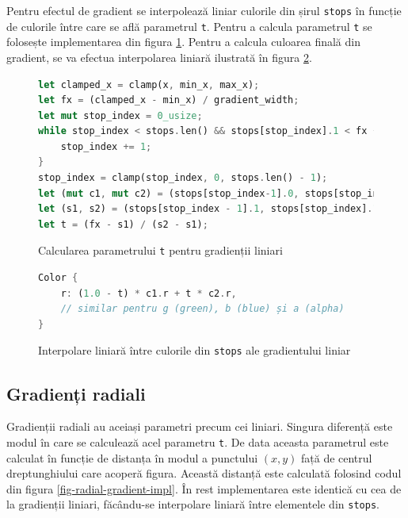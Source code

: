 \documentclass[a4paper, 12pt]{report}
\begin{document}
Pentru efectul de gradient se interpolează liniar culorile din șirul \texttt{stops} în funcție de culorile între care se află
parametrul \texttt{t}. Pentru a calcula parametrul \texttt{t} se folosește implementarea din figura \ref{fig-linear-gradient-impl}.
Pentru a calcula culoarea finală din gradient, se va efectua interpolarea liniară ilustrată în figura \ref{fig-linear-gradient-interpolation}.

\begin{figure}[ht]
    \centering
    \begin{lstlisting}[language=Rust]
let clamped_x = clamp(x, min_x, max_x);
let fx = (clamped_x - min_x) / gradient_width;
let mut stop_index = 0_usize;
while stop_index < stops.len() && stops[stop_index].1 < fx {
    stop_index += 1;
}
stop_index = clamp(stop_index, 0, stops.len() - 1);
let (mut c1, mut c2) = (stops[stop_index-1].0, stops[stop_index].0);
let (s1, s2) = (stops[stop_index - 1].1, stops[stop_index].1);
let t = (fx - s1) / (s2 - s1);
    \end{lstlisting}
    \caption{Calcularea parametrului \texttt{t} pentru gradienții liniari}
    \label{fig-linear-gradient-impl}
\end{figure}

\begin{figure}[ht]
    \centering
    \begin{lstlisting}[language=Rust]
Color {
    r: (1.0 - t) * c1.r + t * c2.r,
    // similar pentru g (green), b (blue) și a (alpha)
}
    \end{lstlisting}
    \caption{Interpolare liniară între culorile din \texttt{stops} ale gradientului liniar}
    \label{fig-linear-gradient-interpolation}
\end{figure}

\subsection{Gradienți radiali}

Gradienții radiali au aceiași parametri precum cei liniari. Singura diferență este modul în care se calculează acel parametru
\texttt{t}. De data aceasta parametrul este calculat în funcție de distanța în modul a punctului \((x, y)\) față de centrul
dreptunghiului care acoperă figura. Această distanță este calculată folosind codul din figura \ref{fig-radial-gradient-impl}.
În rest implementarea este identică cu cea de la gradienții liniari, făcându-se interpolare liniară între elementele din
\texttt{stops}.
\end{document}
